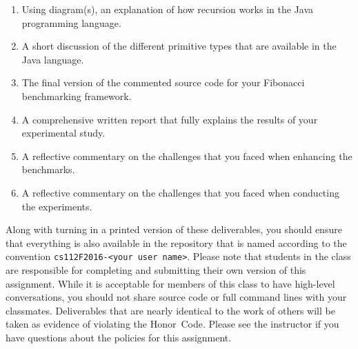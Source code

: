 \vspace*{-.1in}
\begin{enumerate}
  \itemsep0pt
  \item Using diagram(s), an explanation of how recursion works in the Java programming language.

  \item A short discussion of the different primitive types that are available in the Java language.

  \item The final version of the commented source code for your Fibonacci benchmarking framework.

  \item A comprehensive written report that fully explains the results of your experimental study.

  \item A reflective commentary on the challenges that you faced when enhancing the benchmarks.

  \item A reflective commentary on the challenges that you faced when conducting the experiments.

\end{enumerate}
\vspace*{-.1in}

Along with turning in a printed version of these deliverables, you should ensure that everything is also available in
the repository that is named according to the convention {\tt cs112F2016-<your user name>}. Please note that students in
the class are responsible for completing and submitting their own version of this assignment. While it is acceptable for
members of this class to have high-level conversations, you should not share source code or full command lines with your
classmates. Deliverables that are nearly identical to the work of others will be taken as evidence of violating the
\mbox{Honor Code}. Please see the instructor if you have questions about the policies for this assignment.


